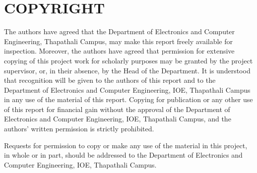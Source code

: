 \newpage
\section*{COPYRIGHT}
{}

The authors have agreed that the Department of Electronics and Computer 
Engineering, Thapathali Campus, may make this report freely available 
for inspection. Moreover, the authors have agreed that permission for 
extensive copying of this project work for scholarly purposes may be 
granted by the project supervisor, or, in their absence, by the Head of 
the Department. It is understood that recognition will be given to the authors
of this report and to the Department of Electronics and Computer Engineering, 
IOE, Thapathali Campus in any use of the material of this report. Copying for 
publication or any other use of this report for financial gain without the approval of the Department of Electronics and Computer Engineering, 
IOE, Thapathali Campus, and the authors’ written permission is strictly prohibited.  

Requests for permission to copy or make any use of the material in this project, in whole or in part, should be addressed to the Department of Electronics and Computer Engineering, IOE, Thapathali Campus.